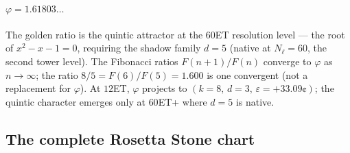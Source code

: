 \documentclass[11pt,a4paper]{article}
\theoremstyle{definition}
\theoremstyle{remark}
\begin{document}
\paragraph{$\varphi = 1.61803\ldots$} The golden ratio is the quintic attractor at the $60$ET resolution level --- the root of $x^{2} - x - 1 = 0$, requiring the shadow family $d = 5$ (native at $N_{\ell} = 60$, the second tower level). The Fibonacci ratios $F(n+1)/F(n)$ converge to $\varphi$ as $n \to \infty$; the ratio $8/5 = F(6)/F(5) = 1.600$ is one convergent (not a replacement for $\varphi$). At $12$ET, $\varphi$ projects to $(k=8,\, d=3,\, \varepsilon = +33.09\text{¢})$; the quintic character emerges only at $60$ET+ where $d = 5$ is native.

\subsection{The complete Rosetta Stone chart}\label{subsec:rosetta-chart}
\end{document}
